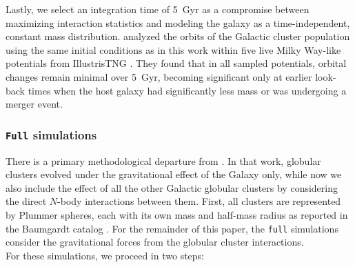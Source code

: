 \documentclass{aa}
\begin{document}
    Lastly, we select an integration time of 5~Gyr as a compromise between maximizing interaction statistics and modeling the galaxy as a time-independent, constant mass distribution. \citet{2023A&A...673A.152I} analyzed the orbits of the Galactic cluster population using the same initial conditions as in this work within five live Milky Way-like potentials from IllustrisTNG \citep{2018MNRAS.473.4077P}. They found that in all sampled potentials, orbital changes remain minimal over 5~Gyr, becoming significant only at earlier look-back times when the host galaxy had significantly less mass or was undergoing a merger event.


    \subsubsection{ \texttt{Full} simulations}
    There is a primary methodological departure from \citet{2023A&A...673A..44F}.  In that work, globular clusters evolved under the gravitational effect of the Galaxy only, while now we also include the effect of all the other Galactic globular clusters by considering the direct $N$-body interactions between them. First, all clusters are represented by Plummer spheres, each with its own mass and half-mass radius as reported in the Baumgardt catalog \citep{2021MNRAS.505.5957B}. For the remainder of this paper, the \texttt{full} simulations consider the gravitational forces from the globular cluster interactions. \\
    For these simulations, we proceed in two steps:
\end{document}
